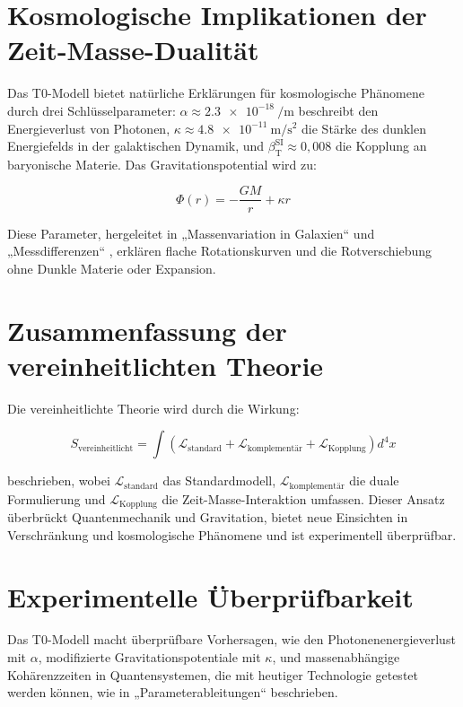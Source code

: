 \documentclass[a4paper,12pt]{article}
\newcommand{\betaT}{\beta_{\text{T}}}
\begin{document}
	\section{Kosmologische Implikationen der Zeit-Masse-Dualität}
	
	Das T0-Modell bietet natürliche Erklärungen für kosmologische Phänomene durch drei Schlüsselparameter: \(\alpha \approx \SI{2.3e-18}{\per\meter}\) beschreibt den Energieverlust von Photonen, \(\kappa \approx \SI{4.8e-11}{\meter\per\second\squared}\) die Stärke des dunklen Energiefelds in der galaktischen Dynamik, und \(\betaT^{\text{SI}} \approx 0{,}008\) die Kopplung an baryonische Materie. Das Gravitationspotential wird zu:
	
	\begin{equation}
		\Phi(r) = -\frac{G M}{r} + \kappa r
	\end{equation}
	
	Diese Parameter, hergeleitet in „Massenvariation in Galaxien“ \cite{pascher_galaxies_2025} und „Messdifferenzen“ \cite{pascher_messdifferenzen_2025}, erklären flache Rotationskurven und die Rotverschiebung ohne Dunkle Materie oder Expansion.
	
	\section{Zusammenfassung der vereinheitlichten Theorie}
	
	Die vereinheitlichte Theorie wird durch die Wirkung:
	
	\begin{equation}
		S_\text{vereinheitlicht} = \int \left( \mathcal{L}_\text{standard} + \mathcal{L}_\text{komplementär} + \mathcal{L}_\text{Kopplung} \right) d^4x
	\end{equation}
	
	beschrieben, wobei \(\mathcal{L}_\text{standard}\) das Standardmodell, \(\mathcal{L}_\text{komplementär}\) die duale Formulierung und \(\mathcal{L}_\text{Kopplung}\) die Zeit-Masse-Interaktion umfassen. Dieser Ansatz überbrückt Quantenmechanik und Gravitation, bietet neue Einsichten in Verschränkung und kosmologische Phänomene und ist experimentell überprüfbar.
	
	\section{Experimentelle Überprüfbarkeit}
	
	Das T0-Modell macht überprüfbare Vorhersagen, wie den Photonenenergieverlust mit \(\alpha\), modifizierte Gravitationspotentiale mit \(\kappa\), und massenabhängige Kohärenzzeiten in Quantensystemen, die mit heutiger Technologie getestet werden können, wie in „Parameterableitungen“ \cite{pascher_params_2025} beschrieben.
	
\end{document}
